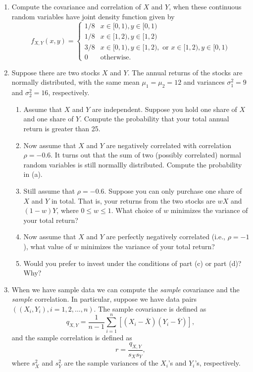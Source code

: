 \documentclass{article}    %
\begin{document}
	\begin{enumerate}[leftmargin=0.55cm]
		
			\item Compute the covariance and correlation of $X$ and $Y$, when these continuous random variables have joint density function given by
		$$f_{X, Y}(x, y) = \begin{cases}
		1/8 & x\in [0, 1), y \in [0, 1) \\
		1/8 & x\in [1, 2), y \in [1, 2) \\
		3/8 & x \in [0, 1), y \in [1, 2), \text{ or } x \in [1, 2), y \in [0, 1) \\
		0 & \text{otherwise.}
		\end{cases}
		$$
		
		
		
		\item Suppose there are two stocks $X$ and
		$Y$. The annual returns of the stocks are normally distributed, with
		the same mean $\mu_1=\mu_2=12$ and variances $\sigma_1^2=9$ and
		$\sigma_2^2=16$, respectively. 
		\begin{enumerate}
			
			\item Assume that $ X $ and $ Y $ are independent. Suppose you hold one share of $X$ and one share of $Y$. Compute the probability that your total annual return is greater than
			25.
			
			\item Now assume that $ X $ and $ Y $ are negatively correlated
			with correlation $\rho=-0.6$. It turns out that the sum of two (possibly
			correlated) normal random variables is still normallly
			distributed. Compute the probability in (a). 
			
			
			\item Still assume that $ \rho = -0.6 $. Suppose you can only purchase one share of $X$
			and $Y$ in total. That is, your returns from the two stocks are $w X$ and $(1-w)Y$,
			where $0 \leq w \leq 1$. What choice of $w$ minimizes the variance of
			your total return?
			
			\item Now assume that $X$ and $Y$ are perfectly negatively
			correlated (i.e., $\rho = -1$), what value of $w$ minimizes the
			variance of your total return? 
			
			
			\item Would you prefer to invest under the conditions
			of part (c) or part (d)? Why? 
			
		\end{enumerate}
		\item When we have sample data we can compute the {\em sample} covariance and the  {\em sample} correlation. In particular, suppose we
		have data pairs $((X_i, Y_i), i = 1, 2, \ldots, n)$. The sample
		covariance is defined as
		$$q_{X,Y} = \frac1 {n-1} \sum_{i=1}^n [(X_i - \bar X) (Y_i - \bar
		Y)],$$
		and the sample correlation is defined as
		$$r = \frac{q_{X, Y}}{s_X s_Y},$$
		where $s_X^2$ and $s_Y^2$ are the sample variances of the $X_i$'s and
		$Y_i$'s, respectively. 
		

\end{enumerate}
\end{document}
